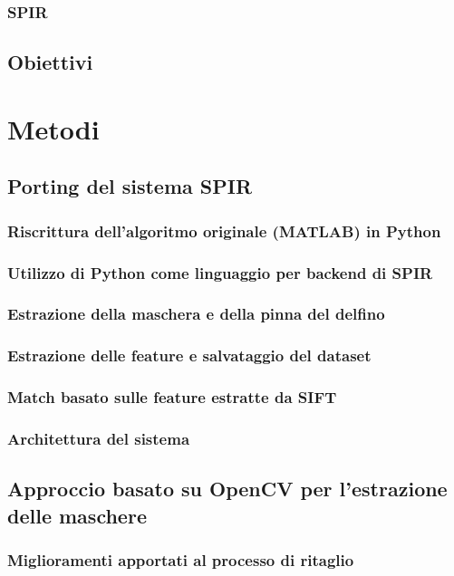 \documentclass[a4paper,12pt]{report}
\begin{document}
\subsection{SPIR}

\section{Obiettivi}

\chapter{Metodi}
\section{Porting del sistema SPIR}
\subsection{Riscrittura dell'algoritmo originale (MATLAB) in Python}
\subsection{Utilizzo di Python come linguaggio per backend di SPIR}
\subsection{Estrazione della maschera e della pinna del delfino}
\subsection{Estrazione delle feature e salvataggio del dataset}
\subsection{Match basato sulle feature estratte da SIFT}
\subsection{Architettura del sistema}

\section{Approccio basato su OpenCV per l'estrazione delle maschere}
\subsection{Miglioramenti apportati al processo di ritaglio}
\end{document}
